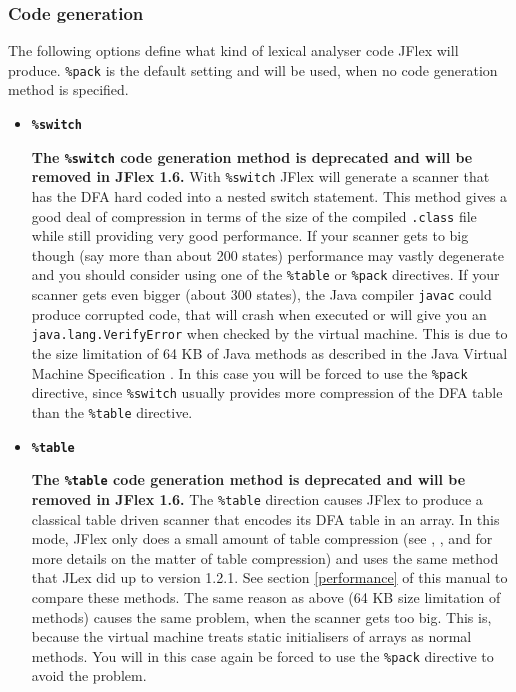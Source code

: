 \documentclass[11pt]{scrartcl}
\newcommand{\nextver}{1.6}
\begin{document}
\subsubsection{Code generation\label{CodeGeneration}}
The following options define what kind of lexical analyser code JFlex
will produce. \texttt{\%pack} is the default setting and will be used,
when no code generation method is specified.
 
\begin{itemize}
\item 
  {\bf \tt \%switch}

  {\bf The \texttt{\%switch} code generation method is deprecated and 
  will be removed in JFlex \nextver.} With \texttt{\%switch} JFlex will
  generate a scanner that has the DFA hard coded into a nested switch
  statement. This method gives a good deal of compression in terms of
  the size of the compiled \texttt{.class} file while still providing
  very good performance. If your scanner gets to big though (say more
  than about 200 states) performance may vastly degenerate and you
  should consider using one of the \texttt{\%table} or \texttt{\%pack}
  directives. If your scanner gets even bigger (about 300 states),
  the Java compiler \texttt{javac} could produce corrupted code, that
  will crash when executed or will give you an \texttt{java.lang.VerifyError}
  when checked by the virtual machine. This is due to the size
  limitation of 64 KB of Java methods as described in the Java Virtual
  Machine Specification \cite{MachineSpec}. In this case you will be
  forced to use the \texttt{\%pack} directive, since \texttt{\%switch}
  usually provides more compression of the DFA table than the
  \texttt{\%table} directive.

 
\item
  {\bf \texttt{\%table}}
  
  {\bf The \texttt{\%table} code generation method is deprecated and 
  will be removed in JFlex \nextver.} The \texttt{\%table} direction causes
  JFlex to produce a classical table driven scanner that encodes its
  DFA table in an array.  In this mode, JFlex only does a small amount
  of table compression (see \cite{ParseTable}, \cite{SparseTable}, 
  \cite{Aho} and \cite{Maurer} for more details on the matter of table
  compression) and uses the same method that JLex did up to version
  1.2.1. See section \ref{performance} 
  of this manual to compare these methods. The same reason as above
  (64 KB size limitation of methods) causes the same problem, when the
  scanner gets too big. This is, because the virtual machine treats
  static initialisers of arrays as normal methods. You will in this
  case again be forced to use the \texttt{\%pack} directive to avoid
  the problem.
 

\end{itemize}
\end{document}
